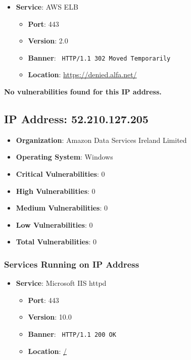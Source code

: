 \documentclass{article}
\begin{document}
\begin{itemize}
    
        \item \textbf{Service}: AWS ELB
        \begin{itemize}
            \item \textbf{Port}: 443
            \item \textbf{Version}:  2.0 
            \item \textbf{Banner}: \texttt{ HTTP/1.1 302 Moved Temporarily
 }
            \item \textbf{Location}: \href{ https://denied.alfa.net/ }{ https://denied.alfa.net/ }
        \end{itemize}
    
\end{itemize}


\textbf{No vulnerabilities found for this IP address.}


\clearpage



\subsection*{IP Address: 52.210.127.205}

\begin{itemize}
    \item \textbf{Organization}: Amazon Data Services Ireland Limited
    \item \textbf{Operating System}:  Windows 
    \item \textbf{Critical Vulnerabilities}: 0
    \item \textbf{High Vulnerabilities}: 0
    \item \textbf{Medium Vulnerabilities}: 0
    \item \textbf{Low Vulnerabilities}: 0
    \item \textbf{Total Vulnerabilities}: 0
\end{itemize}

\subsubsection*{Services Running on IP Address}

\begin{itemize}
    
        \item \textbf{Service}: Microsoft IIS httpd
        \begin{itemize}
            \item \textbf{Port}: 443
            \item \textbf{Version}:  10.0 
            \item \textbf{Banner}: \texttt{ HTTP/1.1 200 OK
 }
            \item \textbf{Location}: \href{ / }{ / }
        \end{itemize}
    
\end{itemize}
\end{document}
